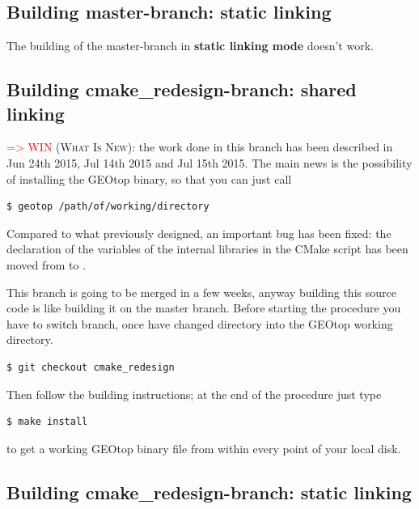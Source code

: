 \subsection{Building master-branch: static linking}

The building of the master-branch in \textbf{static linking mode} doesn't work.

\subsection{Building cmake\_redesign-branch: shared linking}

\textsc{\textcolor{red}{=> WIN} (What Is New):} the work done in this branch has
been described in Jun 24th 2015, Jul 14th 2015 and Jul 15th 2015. The main news is the possibility of installing the GEOtop binary, so that you can just call

\begin{lstlisting}[style=bashStyle]
$ geotop /path/of/working/directory
\end{lstlisting} %

Compared to what previously designed, an important bug has been fixed: the declaration of the variables of the internal libraries in the CMake script has been moved from  to .

This branch is going to be merged in a few weeks, anyway building this source code is like building it on the master branch. Before starting the procedure you have to switch branch, once have changed directory into the GEOtop working directory.

\begin{lstlisting}[style=bashStyle]
$ git checkout cmake_redesign
\end{lstlisting} %

Then follow the building instructions; at the end of the procedure just type

\begin{lstlisting}[style=bashStyle]
$ make install
\end{lstlisting} %

to get a working GEOtop binary file from within every point of your local disk.

\subsection{Building cmake\_redesign-branch: static linking}
